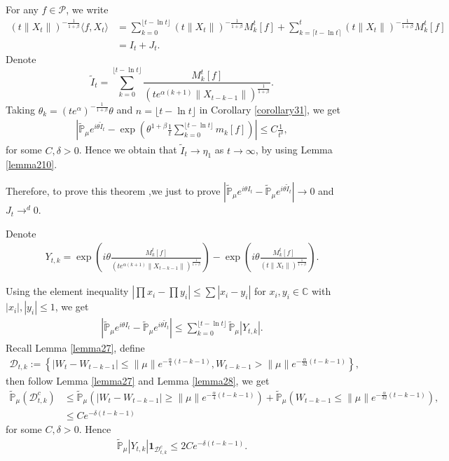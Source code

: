 \documentclass[12pt, a4paper]{amsart}
\theoremstyle{definition}
\numberwithin{equation}{section}
\begin{document}
    For any $f\in\mathcal{P}$, we write
    \begin{align*}
        (t\|X_t\|)^{-\frac{1}{1+\beta}}\langle f,X_t\rangle&=\sum_{k=0}^{\lfloor t-\ln t \rfloor} (t\|X_t\|)^{-\frac{1}{1+\beta}}M_k^t[f]+\sum_{k=\lceil t-\ln t \rceil}^t (t\|X_t\|)^{-\frac{1}{1+\beta}}M_k^t[f]\\
        &=I_t+J_t.
    \end{align*}
    Denote
    $$\tilde{I}_t=\sum_{k=0}^{\lfloor t-\ln t \rfloor}\frac{M_k^t[f]}{(t e^{\alpha(k+1)}\|X_{t-k-1}\|)^{\frac{1}{1+\beta}}}.$$
    Taking $\theta_k=(t e^{\alpha})^{-\frac{1}{1+\beta}} \theta $ and $n={\lfloor t-\ln t \rfloor}$ in Corollary \ref{corollary31}, we get
    \begin{align*}
        \left|\mathbb{\tilde{P}}_{\mu}e^{i\theta\tilde{I}_t}-\exp\left(\theta^{1+\beta}\frac{1}{t}\sum_{k=0}^{\lfloor t-\ln t \rfloor}m_k[f]\right)\right|\leq C \frac{1}{t^{\delta}},
    \end{align*}
    for some $C,\delta>0$. Hence we obtain that $\tilde{I}_t\rightarrow\eta_1$ as $t\rightarrow \infty$, by using Lemma \ref{lemma210}.

    Therefore, to prove this theorem ,we just to prove $\left|\mathbb{\tilde{P}}_{\mu}e^{i\theta I_t}-\mathbb{\tilde{P}}_{\mu}e^{i\theta\tilde{I}_t}\right|\rightarrow 0$ and $J_t\rightarrow^d 0$.

    Denote
    \begin{align*}
        Y_{t,k}=\exp\left(i\theta\frac{M_k^t[f]}{(t e^{\alpha(k+1)}\|X_{t-k-1}\|)^{\frac{1}{1+\beta}}}\right)-\exp\left(i\theta\frac{M_k^t[f]}{\left(t\|X_t\|\right)^{\frac{1}{1+\beta}}}\right).
    \end{align*}

    Using the element inequality $|\prod x_i-\prod y_i|\leq\sum |x_i-y_i|$ for $x_i,y_i \in \mathbb{C}$ with $|x_i|,|y_i|\leq 1$, we get
    \begin{align*}
        \left|\mathbb{\tilde{P}}_{\mu}e^{i\theta I_t}-\mathbb{\tilde{P}}_{\mu}e^{i\theta\tilde{I}_t}\right|\leq \sum_{k=0}^{\lfloor t-\ln t \rfloor}\mathbb{\tilde{P}}_{\mu}|Y_{t,k}|.
    \end{align*}
    Recall Lemma \ref{lemma27}, define
    \begin{align*}
        \mathcal{D}_{t,k}:=\left\{|W_t-W_{t-k-1}|\leq \|\mu\| e^{-\frac{\alpha}{4}(t-k-1)}, W_{t-k-1}>\|\mu\|e^{-\frac{\alpha}{32}(t-k-1)}\right\},
    \end{align*}
    then follow Lemma \ref{lemma27} and Lemma \ref{lemma28}, we get
    \begin{align*}
        \mathbb{\tilde{P}}_{\mu}(\mathcal{D}_{t,k}^c)&\leq \mathbb{\tilde{P}}_{\mu}(|W_t-W_{t-k-1}|\geq \|\mu\| e^{-\frac{\alpha}{4}(t-k-1)})+\mathbb{\tilde{P}}_{\mu}(W_{t-k-1}\leq \|\mu\|e^{-\frac{\alpha}{32}(t-k-1)}),\\
        &\leq C e^{-\delta(t-k-1)}
    \end{align*}
    for some $C,\delta>0$. Hence
    \begin{align}
        \mathbb{\tilde{P}}_{\mu}|Y_{t,k}|\mathbf{1}_{\mathcal{D}^c_{t,k}}\leq 2 C e^{-\delta(t-k-1)}.\label{thm121}
    \end{align}
\end{document}
